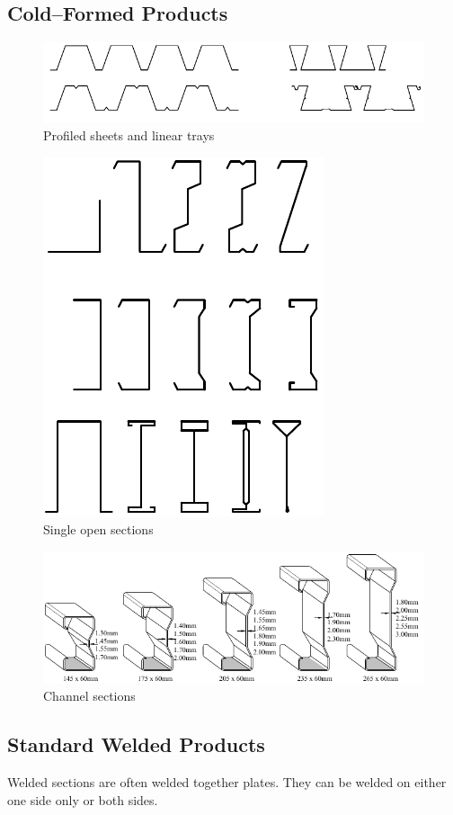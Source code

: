 \subsection{Cold--Formed Products}
\begin{figure}[H]
\centering
\includegraphics[width=.9\textwidth]{PIC/CH02/SHEET}
\caption{Profiled sheets and linear trays \citep{Dubina2012}}
\end{figure}
\begin{figure}[H]
\centering
\includegraphics[width=.45\textwidth]{PIC/CH02/OPEN}
\caption{Single open sections \citep{Dubina2012}}
\end{figure}
\begin{figure}[H]
\centering
\includegraphics[width=.9\textwidth]{PIC/CH02/SUM}
\caption{Channel sections \citep{Dubina2012}}
\end{figure}
\subsection{Standard Welded Products}
Welded sections are often welded together plates. They can be welded on either one side only or both sides.

